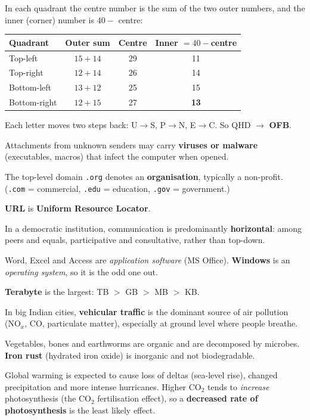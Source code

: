 In each quadrant the centre number is the sum of the two outer numbers, and the inner (corner) number is $40-$ centre:
\begin{center}\small
\begin{tabular}{lccc}\toprule Quadrant & Outer sum & Centre & Inner $=40-$centre\\\midrule
Top-left & $15+14$ & 29 & 11\\ Top-right & $12+14$ & 26 & 14\\ Bottom-left & $13+12$ & 25 & 15\\ Bottom-right & $12+15$ & 27 & \textbf{13}\\\bottomrule
\end{tabular}
\end{center}

Each letter moves two steps back: U$\rightarrow$S, P$\rightarrow$N, E$\rightarrow$C. So QHD $\rightarrow$ \textbf{OFB}.

Attachments from unknown senders may carry \textbf{viruses or malware} (executables, macros) that infect the computer when opened.

The top-level domain \texttt{.org} denotes an \textbf{organisation}, typically a non-profit. (\texttt{.com} = commercial, \texttt{.edu} = education, \texttt{.gov} = government.)

\textbf{URL} is \textbf{Uniform Resource Locator}.

In a democratic institution, communication is predominantly \textbf{horizontal}: among peers and equals, participative and consultative, rather than top-down.

Word, Excel and Access are \emph{application software} (MS Office). \textbf{Windows} is an \emph{operating system}, so it is the odd one out.

\textbf{Terabyte} is the largest: TB $>$ GB $>$ MB $>$ KB.

In big Indian cities, \textbf{vehicular traffic} is the dominant source of air pollution (NO$_x$, CO, particulate matter), especially at ground level where people breathe.

Vegetables, bones and earthworms are organic and are decomposed by microbes. \textbf{Iron rust} (hydrated iron oxide) is inorganic and not biodegradable.

Global warming is expected to cause loss of deltas (sea-level rise), changed precipitation and more intense hurricanes. Higher CO$_2$ tends to \emph{increase} photosynthesis (the CO$_2$ fertilisation effect), so a \textbf{decreased rate of photosynthesis} is the least likely effect.

